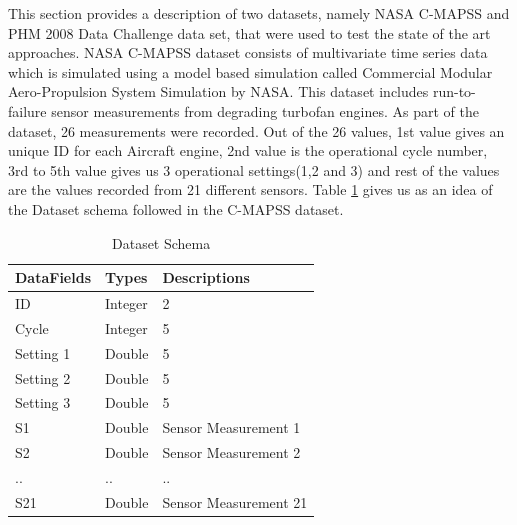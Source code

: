 This section provides a description of two datasets, namely NASA C-MAPSS and PHM 2008 Data Challenge data set, that were used to test the state of the art approaches.
NASA C-MAPSS dataset consists of multivariate time series data which is simulated using a model based simulation called Commercial Modular Aero-Propulsion System Simulation by NASA. This dataset includes run-to-failure sensor measurements from degrading turbofan engines. As part of the dataset, 26 measurements were recorded.
Out of the 26 values, 1st value gives an unique ID for each Aircraft engine, 2nd value is the operational cycle number, 3rd to 5th value gives us 3 operational settings(1,2 and 3) and rest of the values are the values recorded from 21 different sensors. Table \ref{tab:rul_table1} gives us as an idea of the Dataset schema followed in the C-MAPSS dataset.

\begin{table}[ht]
    \begin{tabularx}{\textwidth}{ X | X | X }
        \hline
        \textbf{DataFields} & \textbf{Types} & \textbf{Descriptions} \\ \hline
        ID                  & Integer        & 2                     \\ %
        Cycle               & Integer        & 5                     \\ %
        Setting 1           & Double         & 5                     \\ %
        Setting 2           & Double         & 5                     \\ %
        Setting 3           & Double         & 5                     \\ %
        S1                  & Double         & Sensor Measurement 1  \\ %
        S2                  & Double         & Sensor Measurement 2  \\ %
        ..                  & ..             & ..                    \\ %
        S21                 & Double         & Sensor Measurement 21 \\ \hline
    \end{tabularx}
    \caption{Dataset Schema}
    \label{tab:rul_table1}
\end{table}

